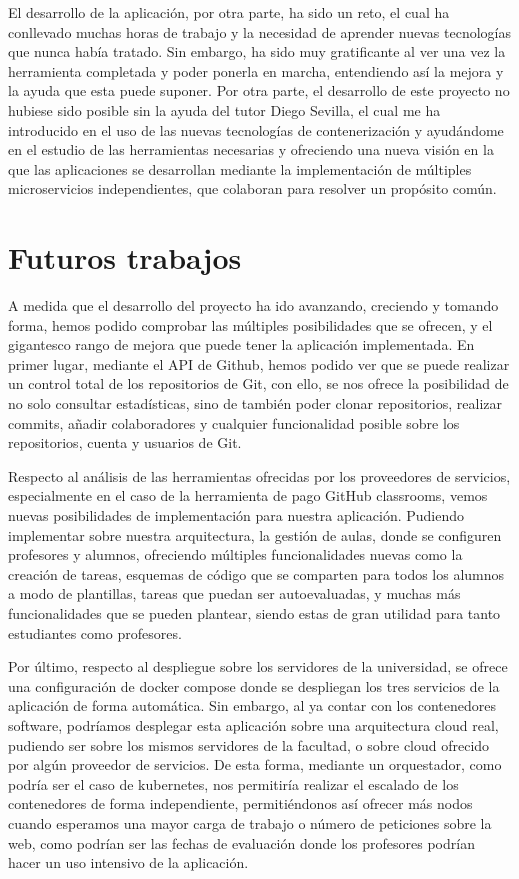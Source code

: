 El desarrollo de la aplicación, por otra parte, ha sido un reto, el cual ha
conllevado muchas horas de trabajo y la necesidad de aprender nuevas
tecnologías que nunca había tratado. Sin embargo, ha sido muy gratificante
al ver una vez la herramienta completada y poder ponerla en marcha,
entendiendo así la mejora y la ayuda que esta puede suponer. Por otra
parte, el desarrollo de este proyecto no hubiese sido posible sin la ayuda
del tutor Diego Sevilla, el cual me ha introducido en el uso de las nuevas
tecnologías de contenerización y ayudándome en el estudio de las
herramientas necesarias y ofreciendo una nueva visión en la que las
aplicaciones se desarrollan mediante la implementación de múltiples
microservicios independientes, que colaboran para resolver un propósito
común.


\section{Futuros trabajos}

A medida que el desarrollo del proyecto ha ido avanzando, creciendo y
tomando forma, hemos podido comprobar las múltiples posibilidades que se
ofrecen, y el gigantesco rango de mejora que puede tener la aplicación
implementada. En primer lugar, mediante el API de Github, hemos podido ver
que se puede realizar un control total de los repositorios de Git, con
ello, se nos ofrece la posibilidad de no solo consultar estadísticas, sino
de también poder clonar repositorios, realizar commits, añadir
colaboradores y cualquier funcionalidad posible sobre los repositorios,
cuenta y usuarios de Git.

Respecto al análisis de las herramientas ofrecidas por los proveedores de
servicios, especialmente en el caso de la herramienta de pago GitHub
classrooms, vemos nuevas posibilidades de implementación para nuestra
aplicación. Pudiendo implementar sobre nuestra arquitectura, la gestión de
aulas, donde se configuren profesores y alumnos, ofreciendo múltiples
funcionalidades nuevas como la creación de tareas, esquemas de código que
se comparten para todos los alumnos a modo de plantillas, tareas que puedan
ser autoevaluadas, y muchas más funcionalidades que se pueden plantear,
siendo estas de gran utilidad para tanto estudiantes como profesores.

Por último, respecto al despliegue sobre los servidores de la universidad,
se ofrece una configuración de docker compose donde se despliegan los tres
servicios de la aplicación de forma automática. Sin embargo, al ya contar
con los contenedores software, podríamos desplegar esta aplicación sobre
una arquitectura cloud real, pudiendo ser sobre los mismos servidores de la
facultad, o sobre cloud ofrecido por algún proveedor de servicios. De esta
forma, mediante un orquestador, como podría ser el caso de kubernetes, nos
permitiría realizar el escalado de los contenedores de forma independiente,
permitiéndonos así ofrecer más nodos cuando esperamos una mayor carga de
trabajo o número de peticiones sobre la web, como podrían ser las fechas de
evaluación donde los profesores podrían hacer un uso intensivo de la
aplicación.


